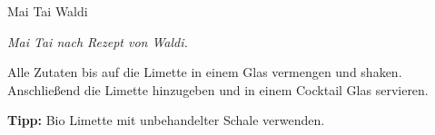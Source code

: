 \begin{recipe}{Mai Tai Waldi}{}{}

  \freeform
  \textit{Mai Tai nach Rezept von Waldi.}


  Alle Zutaten bis auf die Limette in einem Glas vermengen und shaken.
  Anschließend die Limette hinzugeben und in einem Cocktail Glas servieren.

  \freeform
  \hrulefill

  \freeform
  \textbf{Tipp:}
  Bio Limette mit unbehandelter Schale verwenden.

\end{recipe}
